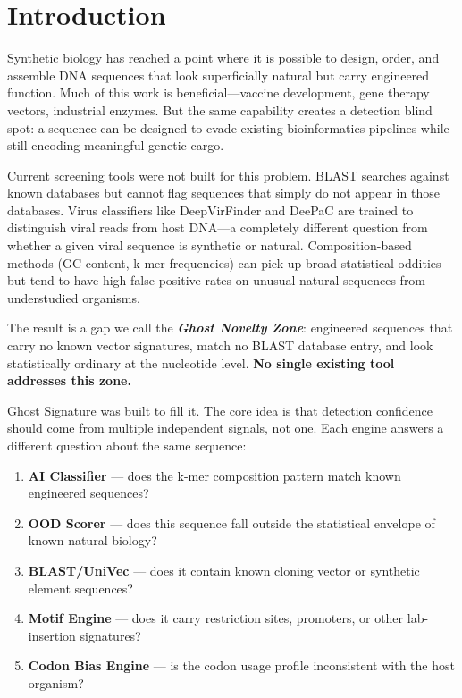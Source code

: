 \documentclass[conference]{IEEEtran}
\begin{document}
\section{Introduction}
\label{sec:intro}

Synthetic biology has reached a point where it is possible to design, order, and assemble DNA sequences that look superficially natural but carry engineered function. Much of this work is beneficial---vaccine development, gene therapy vectors, industrial enzymes. But the same capability creates a detection blind spot: a sequence can be designed to evade existing bioinformatics pipelines while still encoding meaningful genetic cargo.

Current screening tools were not built for this problem. BLAST \cite{altschul1990} searches against known databases but cannot flag sequences that simply do not appear in those databases. Virus classifiers like DeepVirFinder \cite{ren2020} and DeePaC \cite{bartoszewicz2020} are trained to distinguish viral reads from host DNA---a completely different question from whether a given viral sequence is synthetic or natural. Composition-based methods (GC content, k-mer frequencies) can pick up broad statistical oddities but tend to have high false-positive rates on unusual natural sequences from understudied organisms.

The result is a gap we call the \textbf{\textit{Ghost Novelty Zone}}: engineered sequences that carry no known vector signatures, match no BLAST database entry, and look statistically ordinary at the nucleotide level. \textbf{No single existing tool addresses this zone.}

Ghost Signature was built to fill it. The core idea is that detection confidence should come from multiple independent signals, not one. Each engine answers a different question about the same sequence:

\begin{enumerate}
    \item \textbf{AI Classifier} --- does the k-mer composition pattern match known engineered sequences?
    \item \textbf{OOD Scorer} --- does this sequence fall outside the statistical envelope of known natural biology?
    \item \textbf{BLAST/UniVec} --- does it contain known cloning vector or synthetic element sequences?
    \item \textbf{Motif Engine} --- does it carry restriction sites, promoters, or other lab-insertion signatures?
    \item \textbf{Codon Bias Engine} --- is the codon usage profile inconsistent with the host organism?
\end{enumerate}
\end{document}
